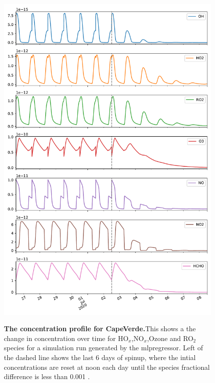 \begin{figure}[H]
    \centering
\includegraphics[width=.9\textwidth]{figures_c3/mlpregressor/conc_cape.pdf}
\label{fig:ccape}
\caption{\textbf{The concentration profile for CapeVerde.}This shows a the change in concentration over time for HO$_x$,NO$_x$,Ozone and RO$_2$ species for a simulation run generated by the mlpregressor. Left of the dashed line shows the last 6 days of spinup, where the intial concentrations are reset at noon each day until the species fractional difference is less than 0.001 .}
\end{figure}

\newpage


